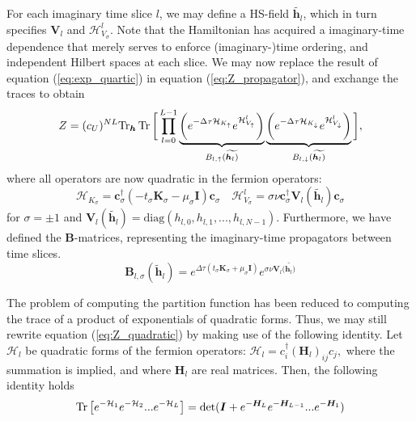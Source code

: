 For each imaginary time slice $l$, we may define a HS-field $\widetilde{\bm h_l}$, which in turn specifies $\bm V_l$ and $\mathcal{H}_{V_\sigma}^l$.
Note that the Hamiltonian has acquired a  imaginary-time dependence that merely serves to enforce (imaginary-)time ordering, and independent Hilbert spaces at each slice.
We may now replace the result of equation (\ref{eq:exp_quartic}) in equation (\ref{eq:Z_propagator}), and exchange the traces to obtain
\begin{equation}\label{eq:Z_quadratic}
Z  = (c_U)^{NL} \text{Tr}_{\bm h} \operatorname{Tr} \bigg[ \prod_{l=0}^{L-1} \underbrace{\bigg( e^{-\Delta\tau  \mathcal{H}_{K_\uparrow}} e^{\mathcal{H}_{V_\uparrow}^l} \bigg)}_{B_{l, \uparrow}(\widetilde{\bm h_l)}} \underbrace{\bigg( e^{-\Delta\tau  \mathcal{H}_{K_\downarrow}} e^{\mathcal{H}_{V_\downarrow}^l} \bigg)}_{B_{l, \downarrow}(\widetilde{\bm h_l)}} \bigg] ,
\end{equation}
where all operators are now quadratic in the fermion operators:
\begin{equation}
\mathcal{H}_{K_\sigma} = \bm c_\sigma^\dagger ( - t_\sigma \bm K_\sigma -\mu_\sigma \bm I ) \bm c_\sigma \quad \mathcal{H}_{V_\sigma}^l = \sigma \nu \bm c_\sigma^\dagger \bm V_l (\widetilde{\bm h_l}) \bm c_\sigma
\end{equation}
for $\sigma = \pm 1$ and $\bm V_l ( \widetilde{\bm h_l} ) = \text{diag} ( h_{l, 0} , h_{l, 1}, ... , h_{l, N-1} )$.
Furthermore, we have defined the $\bm B$-matrices, representing the imaginary-time propagators between time slices.
\begin{equation}
\bm B_{l, \sigma} ( \widetilde{\bm h}_l ) = e^{\Delta \tau ( t_\sigma \bm K_\sigma + \mu_\sigma \bm I)} e^{\sigma \nu \bm V_l (\widetilde{\bm h_l)}}
\end{equation}

The problem of computing the partition function has been reduced to computing the trace of a product of exponentials of quadratic forms.
Thus, we may still rewrite equation (\ref{eq:Z_quadratic}) by making use of the following identity.
Let $\mathcal{H}_l$ be quadratic forms of the fermion operators: 
$
\mathcal{H}_l = c_i^\dagger (\bm H_l)_{ij} c_j,
$
 where the summation is implied, and where $\bm H_l$ are real matrices.
Then, the following identity holds
\begin{equation}\label{eq:quadraticIdentity}
\operatorname{Tr} \big[ e^{-\mathcal{H}_1 } e^{-\mathcal{H}_2 } ... e^{-\mathcal{H}_L } \big] = \text{det} ( \bm I + e^{-\bm H_L} e^{-\bm H_{L-1}} ... e^{-\bm H_1} )
\end{equation}


